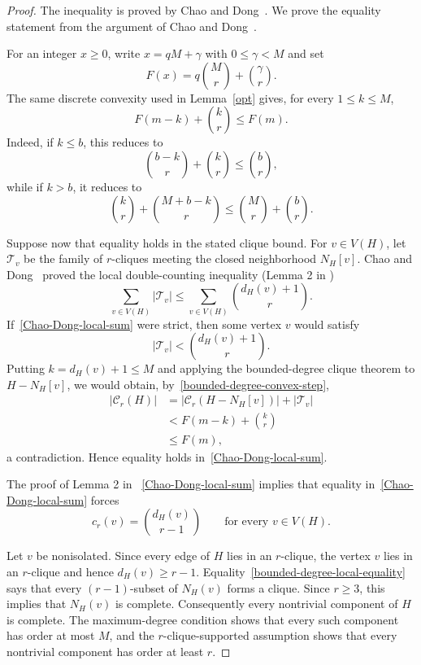 \documentclass[11pt,a4paper]{article}
\begin{document}
\begin{proof}
The inequality is proved by Chao and Dong~\cite{Chao2022}. We prove the equality statement from the argument of Chao and Dong~\cite{Chao2022}.

For an integer $x\ge0$, write $x=qM+\gamma$ with $0\le \gamma<M$ and set
\[
F(x)=q\binom Mr+\binom{\gamma}{r}.
\]
The same discrete convexity used in Lemma~\ref{opt} gives, for every $1\le k\le M$,
\begin{equation}\label{bounded-degree-convex-step}
F(m-k)+\binom kr\le F(m).
\end{equation}
Indeed, if $k\le b$, this reduces to
\[
\binom{b-k}{r}+\binom kr\le\binom br,
\]
while if $k>b$, it reduces to
\[
\binom kr+\binom{M+b-k}{r}
\le
\binom Mr+\binom br.
\]

Suppose now that equality holds in the stated clique bound. For $v\in V(H)$, let $\mathcal T_v$ be the family of $r$-cliques meeting the closed neighborhood $N_H[v]$. Chao and Dong~\cite{Chao2022} proved the local double-counting inequality (Lemma 2 in \cite{Chao2022})
\begin{equation}\label{Chao-Dong-local-sum}
\sum_{v\in V(H)}|\mathcal T_v|
\le
\sum_{v\in V(H)}\binom{d_H(v)+1}{r}.
\end{equation}
If~\eqref{Chao-Dong-local-sum} were strict, then some vertex $v$ would satisfy
\[
|\mathcal T_v|<\binom{d_H(v)+1}{r}.
\]
Putting $k=d_H(v)+1\le M$ and applying the bounded-degree clique theorem to $H-N_H[v]$, we would obtain, by~\eqref{bounded-degree-convex-step},
\[
\begin{aligned}
|\mathcal C_r(H)|
&=|\mathcal C_r(H-N_H[v])|+|\mathcal T_v|\\
&<F(m-k)+\binom kr\\
&\le F(m),
\end{aligned}
\]
a contradiction. Hence equality holds in~\eqref{Chao-Dong-local-sum}.

The proof of Lemma 2 in ~\eqref{Chao-Dong-local-sum}  implies that equality in~\eqref{Chao-Dong-local-sum} forces
\begin{equation}\label{bounded-degree-local-equality}
c_r(v)=\binom{d_H(v)}{r-1}
\qquad\text{for every }v\in V(H).
\end{equation}

Let $v$ be nonisolated. Since every edge of $H$ lies in an $r$-clique, the vertex $v$ lies in an $r$-clique and hence $d_H(v)\ge r-1$. Equality~\eqref{bounded-degree-local-equality} says that every $(r-1)$-subset of $N_H(v)$ forms a clique. Since $r\ge3$, this implies that $N_H(v)$ is complete. Consequently every nontrivial component of $H$ is complete. The maximum-degree condition shows that every such component has order at most $M$, and the $r$-clique-supported assumption shows that every nontrivial component has order at least $r$.


\end{proof}
\end{document}

